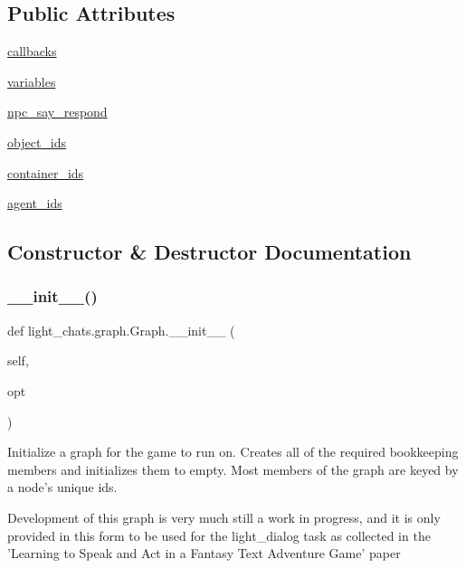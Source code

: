 \subsection*{Public Attributes}
\begin{DoxyCompactItemize}
\item 
\hyperlink{classlight__chats_1_1graph_1_1Graph_a95a1a4d31dbd607eebd593579b2d6cdd}{callbacks}
\item 
\hyperlink{classlight__chats_1_1graph_1_1Graph_a29a00f3191fb45f73bd784ed12cc2c2e}{variables}
\item 
\hyperlink{classlight__chats_1_1graph_1_1Graph_ad461dca41746ab79ffdaf70f6a9b25c4}{npc\+\_\+say\+\_\+respond}
\item 
\hyperlink{classlight__chats_1_1graph_1_1Graph_a8ac9ab3b5c6208e0df9b28d436c7c425}{object\+\_\+ids}
\item 
\hyperlink{classlight__chats_1_1graph_1_1Graph_a79bd1a69e214458644ecf74d218e476c}{container\+\_\+ids}
\item 
\hyperlink{classlight__chats_1_1graph_1_1Graph_a2bd5d1191b6a64402e7bb1f992516265}{agent\+\_\+ids}
\end{DoxyCompactItemize}


\subsection{Constructor \& Destructor Documentation}
\mbox{\label{classlight__chats_1_1graph_1_1Graph_a5bd7cc4e21edc98dcbbac1040f68c878}} 
\subsubsection{\texorpdfstring{\+\_\+\+\_\+init\+\_\+\+\_\+()}{\_\_init\_\_()}}
{\footnotesize\ttfamily def light\+\_\+chats.\+graph.\+Graph.\+\_\+\+\_\+init\+\_\+\+\_\+ (\begin{DoxyParamCaption}\item[{}]{self,  }\item[{}]{opt }\end{DoxyParamCaption})}

\begin{DoxyVerb}Initialize a graph for the game to run on. Creates all of the required
bookkeeping members and initializes them to empty. Most members of the graph are
keyed by a node's unique ids.

Development of this graph is very much still a work in progress, and it is only
provided in this form to be used for the light_dialog task as collected in the
'Learning to Speak and Act in a Fantasy Text Adventure Game' paper
\end{DoxyVerb}
 

